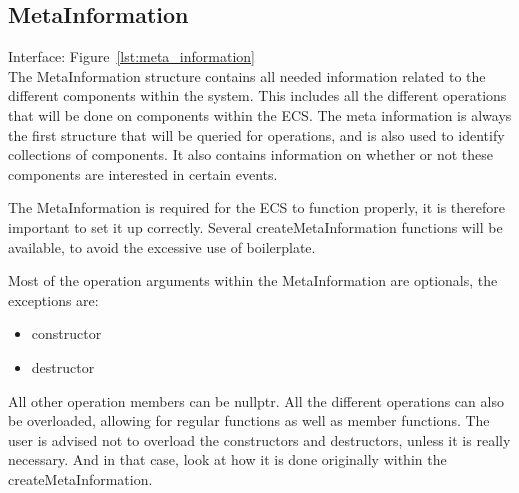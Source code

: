 \subsection{MetaInformation}
Interface: Figure~\ref{lst:meta_information}\\\noindent
The MetaInformation structure contains all needed information related to the different components within the system.
This includes all the different operations that will be done on components within the ECS.
The meta information is always the first structure that will be queried for operations, and is also used to identify collections of components.
It also contains information on whether or not these components are interested in certain events. 

The MetaInformation is required for the ECS to function properly, it is therefore important to set it up correctly.
Several createMetaInformation functions will be available, to avoid the excessive use of boilerplate.

Most of the operation arguments within the MetaInformation are optionals, the exceptions are:
\begin{itemize}
    \item constructor
    \item destructor
\end{itemize}
All other operation members can be nullptr. All the different operations can also be overloaded, 
allowing for regular functions as well as member functions.
The user is advised not to overload the constructors and destructors, unless it is really necessary.
And in that case, look at how it is done originally within the createMetaInformation.

